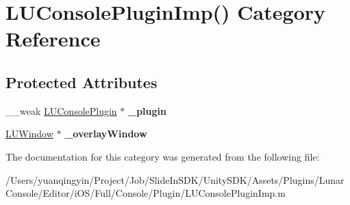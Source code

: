 \hypertarget{category_l_u_console_plugin_imp_07_08}{}\section{L\+U\+Console\+Plugin\+Imp() Category Reference}
\label{category_l_u_console_plugin_imp_07_08}
\subsection*{Protected Attributes}
\begin{DoxyCompactItemize}
\item 
\mbox{\label{category_l_u_console_plugin_imp_07_08_af6dc62035584e2073580a4548d60641f}} 
\+\_\+\+\_\+weak \mbox{\hyperlink{interface_l_u_console_plugin}{L\+U\+Console\+Plugin}} $\ast$ {\bfseries \+\_\+plugin}
\item 
\mbox{\label{category_l_u_console_plugin_imp_07_08_ace6631dc6e9b205c1f11bd063de0b7b4}} 
\mbox{\hyperlink{interface_l_u_window}{L\+U\+Window}} $\ast$ {\bfseries \+\_\+overlay\+Window}
\end{DoxyCompactItemize}


The documentation for this category was generated from the following file\+:\begin{DoxyCompactItemize}
\item 
/\+Users/yuanqingyin/\+Project/\+Job/\+Slide\+In\+S\+D\+K/\+Unity\+S\+D\+K/\+Assets/\+Plugins/\+Lunar\+Console/\+Editor/i\+O\+S/\+Full/\+Console/\+Plugin/L\+U\+Console\+Plugin\+Imp.\+m\end{DoxyCompactItemize}

